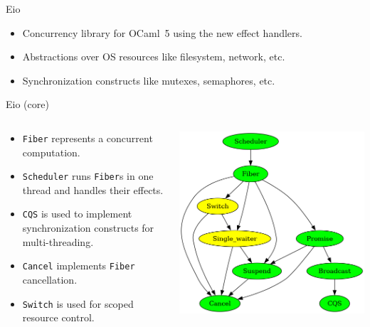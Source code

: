 \documentclass[aspectratio=43]{beamer}
\newcommand{\ocaml}[1]{\texttt{#1}}
\newcommand{\ocf}{OCaml~5}
\begin{document}
\begin{frame}{Eio}
    \begin{itemize}
        \item Concurrency library for \ocf{} using the new effect handlers.
        \item Abstractions over OS resources like filesystem, network, etc.
        \item Synchronization constructs like mutexes, semaphores, etc.
    \end{itemize}
\end{frame}


\begin{frame}{Eio (core)}
    \begin{columns}
        \begin{column}{0.5\textwidth}
            \begin{itemize}
                \item \ocaml{Fiber} represents a concurrent computation.
                \item \ocaml{Scheduler} runs \ocaml{Fiber}s in one thread and handles their effects.
                \item \ocaml{CQS} is used to implement synchronization constructs for multi-threading.
                \item \ocaml{Cancel} implements \ocaml{Fiber} cancellation.
                \item \ocaml{Switch} is used for scoped resource control.
            \end{itemize}
        \end{column}
        \begin{column}{0.5\textwidth}
            \includegraphics[width=\textwidth]{codept}
        \end{column}
    \end{columns}
\end{frame}
\end{document}
